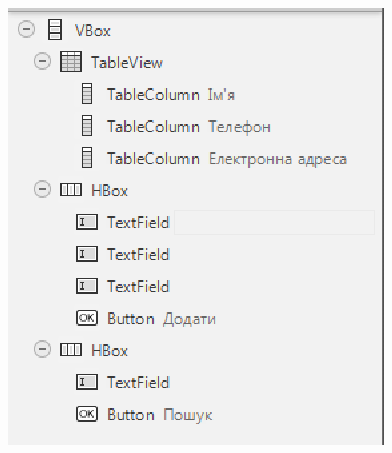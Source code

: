 \begin{figure}[h]
	\includegraphics{chapter16/images/image2.png}
	\caption{}
	\label{fig16:image2}
\end{figure}

